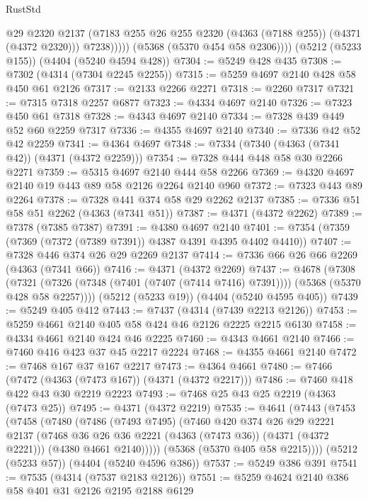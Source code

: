 \begin{lexlean}{RustStd}
\begin{coremodule}
                  @29
                  @2320
                  @2137
                  (@7183 @255 @26 @255 @2320 (@4363 (@7188 @255)) (@4371 (@4372 @2320)))
                  @7238)))))
        (@5368 (@5370 @454 @58 @2306))))
    (@5212 (@5233 @155))
    (@4404 (@5240 @4594 @428))
@7304 := @5249 @428 @435
@7308 := @7302 (@4314 (@7304 @2245 @2255))
@7315 := @5259 @4697 @2140 @428 @58 @450 @61 @2126
@7317 := @2133 @2266 @2271
@7318 := @2260 @7317
@7321 := @7315 @7318 @2257 @6877
@7323 := @4334 @4697 @2140
@7326 := @7323 @450 @61 @7318
@7328 := @4343 @4697 @2140
@7334 := @7328 @439 @449 @52 @60 @2259 @7317
@7336 := @4355 @4697 @2140
@7340 := @7336 @42 @52 @42 @2259
@7341 := @4364 @4697
@7348 := @7334 (@7340 (@4363 (@7341 @42)) (@4371 (@4372 @2259)))
@7354 := @7328 @444 @448 @58 @30 @2266 @2271
@7359 := @5315 @4697 @2140 @444 @58 @2266
@7369 := @4320 @4697 @2140 @19 @443 @89 @58 @2126 @2264 @2140 @960
@7372 := @7323 @443 @89 @2264
@7378 := @7328 @441 @374 @58 @29 @2262 @2137
@7385 := @7336 @51 @58 @51 @2262 (@4363 (@7341 @51))
@7387 := @4371 (@4372 @2262)
@7389 := @7378 (@7385 @7387)
@7391 := @4380 @4697 @2140
@7401 := @7354 (@7359 (@7369 (@7372 (@7389 @7391)) @4387 @4391 @4395 @4402 @4410))
@7407 := @7328 @446 @374 @26 @29 @2269 @2137
@7414 := @7336 @66 @26 @66 @2269 (@4363 (@7341 @66))
@7416 := @4371 (@4372 @2269)
@7437 := @4678
    (@7308
      (@7321 (@7326 (@7348 (@7401 (@7407 (@7414 @7416) @7391)))) (@5368 (@5370 @428 @58 @2257))))
    (@5212 (@5233 @19))
    (@4404 (@5240 @4595 @405))
@7439 := @5249 @405 @412
@7443 := @7437 (@4314 (@7439 @2213 @2126))
@7453 := @5259 @4661 @2140 @405 @58 @424 @46 @2126 @2225 @2215 @6130
@7458 := @4334 @4661 @2140 @424 @46 @2225
@7460 := @4343 @4661 @2140
@7466 := @7460 @416 @423 @37 @45 @2217 @2224
@7468 := @4355 @4661 @2140
@7472 := @7468 @167 @37 @167 @2217
@7473 := @4364 @4661
@7480 := @7466 (@7472 (@4363 (@7473 @167)) (@4371 (@4372 @2217)))
@7486 := @7460 @418 @422 @43 @30 @2219 @2223
@7493 := @7468 @25 @43 @25 @2219 (@4363 (@7473 @25))
@7495 := @4371 (@4372 @2219)
@7535 := @4641
    (@7443
      (@7453
        (@7458
          (@7480
            (@7486
              (@7493 @7495)
              (@7460
                @420
                @374
                @26
                @29
                @2221
                @2137
                (@7468 @36 @26 @36 @2221 (@4363 (@7473 @36)) (@4371 (@4372 @2221)))
                (@4380 @4661 @2140)))))
        (@5368 (@5370 @405 @58 @2215))))
    (@5212 (@5233 @57))
    (@4404 (@5240 @4596 @386))
@7537 := @5249 @386 @391
@7541 := @7535 (@4314 (@7537 @2183 @2126))
@7551 := @5259 @4624 @2140 @386 @58 @401 @31 @2126 @2195 @2188 @6129

\end{coremodule}
\end{lexlean}

